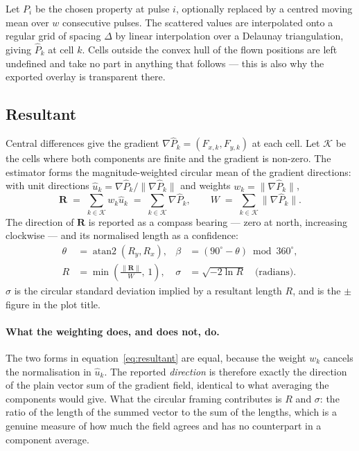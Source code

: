 \documentclass[11pt,a4paper]{article}
\begin{document}
Let $P_i$ be the chosen property at pulse $i$, optionally replaced by a centred
moving mean over $w$ consecutive pulses. The scattered values are interpolated
onto a regular grid of spacing $\Delta$ by linear interpolation over a Delaunay
triangulation, giving $\hat P_k$ at cell $k$. Cells outside the convex hull of
the flown positions are left undefined and take no part in anything that
follows --- this is also why the exported overlay is transparent there.

\subsection{Resultant}

Central differences give the gradient $\nabla \hat P_k = (F_{x,k}, F_{y,k})$ at
each cell. Let $\mathcal{K}$ be the cells where both components are finite and
the gradient is non-zero. The estimator forms the magnitude-weighted circular
mean of the gradient directions: with unit directions
$\hat u_k = \nabla \hat P_k / \lVert \nabla \hat P_k \rVert$ and weights
$w_k = \lVert \nabla \hat P_k \rVert$,
%
\begin{equation}
\mathbf{R} \;=\; \sum_{k \in \mathcal{K}} w_k \hat u_k
           \;=\; \sum_{k \in \mathcal{K}} \nabla \hat P_k,
\qquad
W \;=\; \sum_{k \in \mathcal{K}} \bigl\lVert \nabla \hat P_k \bigr\rVert .
\label{eq:resultant}
\end{equation}
%
The direction of $\mathbf{R}$ is reported as a compass bearing --- zero at
north, increasing clockwise --- and its normalised length as a confidence:
%
\begin{align}
\theta &= \operatorname{atan2}(R_y, R_x), &
\beta  &= \left(90^\circ - \theta\right) \bmod 360^\circ, \\[2pt]
R      &= \min\!\left(\frac{\lVert \mathbf{R} \rVert}{W},\, 1\right), &
\sigma &= \sqrt{-2\ln R} \quad \text{(radians)} .
\end{align}
%
$\sigma$ is the circular standard deviation implied by a resultant length $R$,
and is the $\pm$ figure in the plot title.

\paragraph{What the weighting does, and does not, do.}
The two forms in equation~\eqref{eq:resultant} are equal, because the weight
$w_k$ cancels the normalisation in $\hat u_k$. The reported \emph{direction} is
therefore exactly the direction of the plain vector sum of the gradient field,
identical to what averaging the components would give. What the circular framing
contributes is $R$ and $\sigma$: the ratio of the length of the summed vector to
the sum of the lengths, which is a genuine measure of how much the field agrees
and has no counterpart in a component average.
\end{document}
